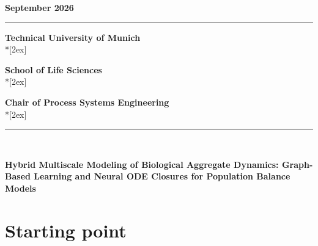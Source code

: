 \documentclass[11pt,a4paper,twoside]{scrartcl}
\begin{document}
\begin{center}
\vspace*{0.8cm}

{\large \textbf{\textsf{September 2026}}}

\vspace*{0.4cm}

\rule{16cm}{0.08cm}
\vspace*{0.2cm}

{\Large \textbf{\textsf{Technical University of Munich}}}\\*[2ex]

{\Large \textbf{\textsf{School of Life Sciences}}}\\*[2ex]

{\Large \textbf{\textsf{Chair of Process Systems Engineering}}}\\*[2ex]

\vspace*{0.0cm}
\rule{16cm}{0.08cm}
\end{center}

\newpage


~~\\

\thispagestyle{empty}

\newpage





\begin{center}
  {\LARGE \textbf{\textsf{Hybrid Multiscale Modeling of Biological Aggregate Dynamics: Graph-Based Learning and Neural ODE Closures for Population Balance Models}}} 
\end{center}


\section{Starting point}
\def\mbsecname{Ausgagspunkt}
\label{Starting_point}

\end{document}
